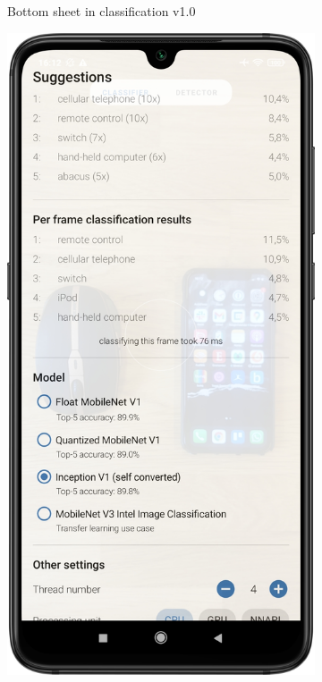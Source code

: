 \documentclass[
			   fontsize=11pt,
               paper=a4,
               bibliography=totoc,
               idxtotoc,
               headsepline,
               footsepline,
               footinclude=false,
               BCOR=12mm,
               DIV=13,
               openany,   %
               oneside    %
               ]
               {scrbook}
\begin{document}
\begin{figure}[H]
\begin{subfigure}{.23\textwidth}
		\caption[Screenshots of the previous app in version 1.0 showing the classification activity with its bottom sheet expanded]{Bottom sheet in classification v1.0}
		\label{fig:appImage21}
	\end{subfigure}
	\hfil
	\begin{subfigure}{.23\textwidth}
		\centering
		\includegraphics[width=\linewidth]{figures/app_class_sheet_new.png}

\end{subfigure}
\end{figure}
\end{document}
